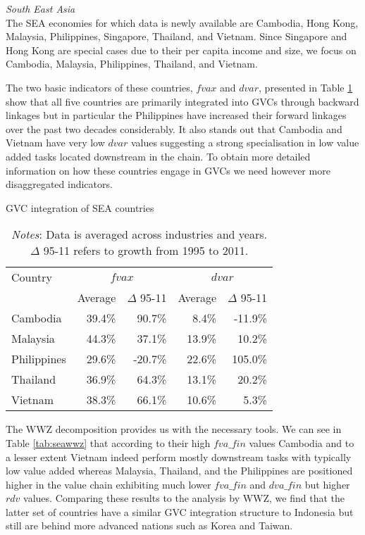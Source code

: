 \documentclass[a4paper,11pt]{article}
\begin{document}
\textit{South East Asia}\\
The SEA economies for which data is newly available are Cambodia, Hong Kong, Malaysia, Philippines, Singapore, Thailand, and Vietnam. Since Singapore and Hong Kong are special cases due to their per capita income and size, we focus on Cambodia, Malaysia, Philippines, Thailand, and Vietnam. 

The two basic indicators of these countries, $fvax$ and $dvar$, presented in Table \ref{tab:seagvc} show that all five countries are primarily integrated into GVCs through backward linkages but in particular the Philippines have increased their forward linkages over the past two decades considerably. It also stands out that Cambodia and Vietnam have very low $dvar$ values suggesting a strong specialisation in low value added tasks located downstream in the chain. To obtain more detailed information on how these countries engage in GVCs we need however more disaggregated indicators.

\begin{table}\small
  \centering
  \caption{GVC integration of SEA countries}
    \begin{tabular}{lrrrr}
    \toprule
    Country & \multicolumn{2}{c}{{$fvax$}} & \multicolumn{2}{c}{{$dvar$}} \\
    \multicolumn{1}{c}{} & \multicolumn{1}{c}{Average} & \multicolumn{1}{c}{$\Delta$ 95-11} & \multicolumn{1}{c}{Average} & \multicolumn{1}{c}{$\Delta$ 95-11} \\
    \midrule
    Cambodia & 39.4\% & 90.7\% & 8.4\% & -11.9\% \\
    Malaysia & 44.3\% & 37.1\% & 13.9\% & 10.2\% \\
    Philippines & 29.6\% & -20.7\% & 22.6\% & 105.0\% \\
    Thailand & 36.9\% & 64.3\% & 13.1\% & 20.2\% \\
    Vietnam & 38.3\% & 66.1\% & 10.6\% & 5.3\% \\
    \bottomrule
    \end{tabular}
  \label{tab:seagvc}
  \caption*{\textit{Notes}: Data is averaged across industries and years. $\Delta$ 95-11 refers to growth from 1995 to 2011.}
\end{table}

The WWZ decomposition provides us with the necessary tools. We can see in Table \ref{tab:seawwz} that according to their high $fva\_fin$ values Cambodia and to a lesser extent Vietnam indeed perform mostly downstream tasks with typically low value added whereas Malaysia, Thailand, and the Philippines are positioned higher in the value chain exhibiting much lower $fva\_fin$ and $dva\_fin$ but higher $rdv$ values. Comparing these results to the analysis by WWZ, we find that the latter set of countries have a similar GVC integration structure to Indonesia but still are behind more advanced nations such as Korea and Taiwan. 
\end{document}

